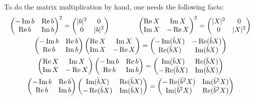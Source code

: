 \documentclass[parskip=half]{scrartcl}
\begin{document}
To do the matrix multiplication by hand, one needs the following facts:
\begin{gather*}
	\begin{pmatrix}
		-\Im b & \Re b \\ \Re b & \Im b
	\end{pmatrix}^2
	=
	\begin{pmatrix}
		\abs{b}^2 & 0 \\ 0 & \abs{b}^2
	\end{pmatrix} \qquad \qquad 
	\begin{pmatrix}
		\Re X & \Im X \\ \Im X & -\Re X
	\end{pmatrix}^2
	=
	\begin{pmatrix}
		\abs{X}^2 & 0 \\ 0 & \abs{X}^2
	\end{pmatrix}\\
	\begin{pmatrix}
	-\Im b & \Re b \\ \Re b & \Im b
	\end{pmatrix}
	\begin{pmatrix}
		\Re X & \Im X \\ \Im X & -\Re X
	\end{pmatrix}
	=
	\begin{pmatrix}
		-\Im(\bar bX) & -\Re(\bar bX) \\ \Re(\bar bX) & \Im(\bar bX)
	\end{pmatrix}\\
	\begin{pmatrix}
	\Re X & \Im X \\ \Im X & -\Re X
	\end{pmatrix}
	\begin{pmatrix}
	-\Im b & \Re b \\ \Re b & \Im b
	\end{pmatrix}
	=
	\begin{pmatrix}
	\Im(\bar bX) & \Re(\bar bX) \\ -\Re(\bar bX) & \Im(\bar bX)
	\end{pmatrix}\\
	\begin{pmatrix}
	-\Im b & \Re b \\ \Re b & \Im b
	\end{pmatrix}
	\begin{pmatrix}
		\Im(\bar bX) & \Re(\bar bX) \\ -\Re(\bar bX) & \Im(\bar bX)
	\end{pmatrix}
	=
	\begin{pmatrix}
		-\Re(\bar b^2X) & \Im(\bar b^2X) \\ \Im(\bar b^2X) & \Re(\bar b^2X)
	\end{pmatrix}
\end{gather*}
\end{document}
